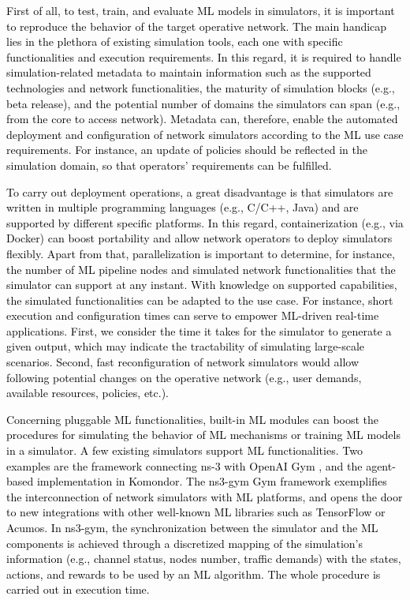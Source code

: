 \documentclass[journal]{IEEEtran}
\begin{document}
	\textcolor{black}{First of all, to test, train, and evaluate ML models in simulators, it is important to reproduce the behavior of the target operative network. The main handicap lies in the plethora of existing simulation tools, each one with specific functionalities and execution requirements. In this regard, it is required to handle simulation-related metadata to maintain information such as the supported technologies and network functionalities, the maturity of simulation blocks (e.g., beta release), and the potential number of domains the simulators can span (e.g., from the core to access network). Metadata can, therefore, enable the automated deployment and configuration of network simulators according to the ML use case requirements. For instance, an update of policies should be reflected in the simulation domain, so that operators' requirements can be fulfilled.}
	
	\textcolor{black}{To carry out deployment operations, a great disadvantage is that simulators are written in multiple programming languages (e.g., C/C++, Java) and are supported by different specific platforms. In this regard, containerization (e.g., via Docker) can boost portability and allow network operators to deploy simulators flexibly. Apart from that, parallelization is important to determine, for instance, the number of ML pipeline nodes and simulated network functionalities that the simulator can support at any instant.} \textcolor{black}{With knowledge on supported capabilities, the simulated functionalities can be adapted to the use case. For instance, short execution and configuration times can serve to empower ML-driven real-time applications. First, we consider the time it takes for the simulator to generate a given output, which may indicate the tractability of simulating large-scale scenarios. Second, fast reconfiguration of network simulators would allow following potential changes on the operative network (e.g., user demands, available resources, policies, etc.).} 
 		
	\textcolor{black}{Concerning pluggable ML functionalities, built-in ML modules can boost the procedures for simulating the behavior of ML mechanisms or training ML models in a simulator. A few existing simulators support ML functionalities. Two examples are the framework connecting ns-3 with OpenAI Gym \cite{gawlowicz2019ns}, and the agent-based implementation in Komondor. The ns3-gym Gym framework exemplifies the interconnection of network simulators with ML platforms, and opens the door to new integrations with other well-known ML libraries such as TensorFlow or Acumos. In ns3-gym, the synchronization between the simulator and the ML components is achieved through a discretized mapping of the simulation's information (e.g., channel status, nodes number, traffic demands) with the states, actions, and rewards to be used by an ML algorithm. The whole procedure is carried out in execution time.}
		    
\end{document}
